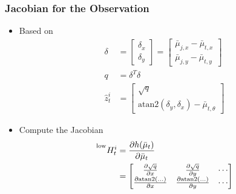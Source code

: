 \begin{frame}
    \frametitle{Jacobian for the Observation}

    \begin{itemize}
        \item Based on
        \begin{align*}
            \delta &= 
            \begin{bmatrix}
                \delta_x \\
                \delta_y
            \end{bmatrix}
            = \begin{bmatrix}
                \bar{\mu}_{j,x} - \bar{\mu}_{t,x} \\
                \bar{\mu}_{j,y} - \bar{\mu}_{t,y}
            \end{bmatrix}\\
            q &= \delta^T \delta\\
            \hat{z}^i_t &= 
            \begin{bmatrix}
                \sqrt{q} \\
                \text{atan2}(\delta_y, \delta_x) - \bar{\mu}_{t,\theta}
            \end{bmatrix}
        \end{align*}    
        \item Compute the Jacobian
        \begin{align*}
            \prescript{\text{low}}{}{H^{i}_{t}} &= \frac{\partial h(\bar{\mu}_t)}{\partial \bar{\mu}_t}\\
            &= \begin{bmatrix}
                \frac{\partial \sqrt{q}}{\partial x} & \frac{\partial \sqrt{q}}{\partial y} & \cdots \\
                \frac{\partial \text{atan2}(\ldots)}{\partial x} & \frac{\partial \text{atan2}(\ldots)}{\partial y} & \cdots
            \end{bmatrix}
    \end{align*} 
    \end{itemize}

\end{frame}

